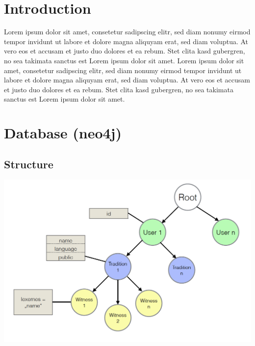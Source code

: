 \documentclass[11pt,fleqn,openany]{book} %
\begin{document}


\chapter{Introduction}

Lorem ipsum dolor sit amet, consetetur sadipscing elitr, sed diam nonumy eirmod tempor invidunt ut labore et dolore magna aliquyam erat, sed diam voluptua. At vero eos et accusam et justo duo dolores et ea rebum. Stet clita kasd gubergren, no sea takimata sanctus est Lorem ipsum dolor sit amet. Lorem ipsum dolor sit amet, consetetur sadipscing elitr, sed diam nonumy eirmod tempor invidunt ut labore et dolore magna aliquyam erat, sed diam voluptua. At vero eos et accusam et justo duo dolores et ea rebum. Stet clita kasd gubergren, no sea takimata sanctus est Lorem ipsum dolor sit amet.




\chapter{Database (neo4j)}

\section{Structure}

\begin{center}
\includegraphics[scale=0.65]{Pictures/db_overview.png} 
\end{center}
\end{document}
